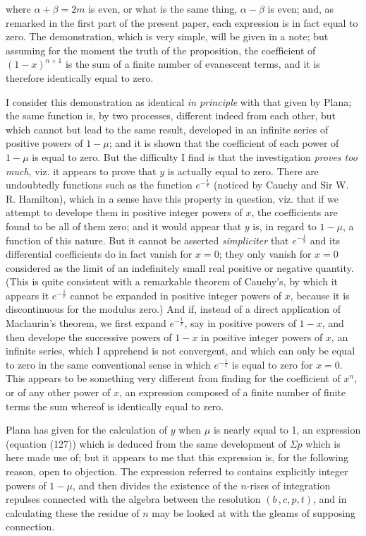 \documentclass[11pt,a4paper]{book}
\begin{document}
\setcounter{page}{105}

where $\alpha+\beta = 2m$ is even, or what is the same thing, $\alpha - \beta$ is even; and, as remarked in the first part of the present paper, each expression is in fact equal to zero. The demonstration, which is very simple, will be given in a note; but assuming for the moment the truth of the proposition, the coefficient of $(1-x)^{n+1}$ is the sum of a finite number of evanescent terms, and it is therefore identically equal to zero.

I consider this demonstration as identical \textit{in principle} with that given by Plana; the same function is, by two processes, different indeed from each other, but which cannot but lead to the same result, developed in an infinite series of positive powers of $1-\mu$; and it is shown that the coefficient of each power of $1-\mu$ is equal to zero. But the difficulty I find is that the investigation \textit{proves too much}, viz. it appears to prove that $y$ is actually equal to zero. There are undoubtedly functions such as the function $e^{-\frac{1}{x}}$ (noticed by Cauchy and Sir W. R. Hamilton), which in a sense have this property in question, viz. that if we attempt to develope them in positive integer powers of $x$, the coefficients are found to be all of them zero; and it would appear that $y$ is, in regard to $1-\mu$, a function of this nature. But it cannot be asserted \textit{simpliciter} that $e^{-\frac{1}{x}}$ and its differential coefficients do in fact vanish for $x=0$; they only vanish for $x=0$ considered as the limit of an indefinitely small real positive or negative quantity. (This is quite consistent with a remarkable theorem of Cauchy's, by which it appears it $e^{-\frac{1}{x}}$ cannot be expanded in positive integer powers of $x$, because it is discontinuous for the modulus zero.) And if, instead of a direct application of Maclaurin's theorem, we first expand $e^{-\frac{1}{x}}$, say in positive powers of $1-x$, and then develope the successive powers of $1-x$ in positive integer powers of $x$, an infinite series, which I apprehend is not convergent, and which can only be equal to zero in the same conventional sense in which $e^{-\frac{1}{x}}$ is equal to zero for $x=0$. This appears to be something very different from finding for the coefficient of $x^n$, or of any other power of $x$, an expression composed of a finite number of finite terms the sum whereof is identically equal to zero.

Plana has given for the calculation of $y$ when $\mu$ is nearly equal to 1, an expression (equation (127)) which is deduced from the same development of $\Sigma p$ which is here made use of; but it appears to me that this expression is, for the following reason, open to objection. The expression referred to contains explicitly integer powers of $1-\mu$, and then divides the existence of the $n$-rises of integration repulses connected with the algebra between the resolution $(b\,, c, p, t)$, and in calculating these the residue of $n$ may be looked at with the gleams of supposing connection.
\end{document}
